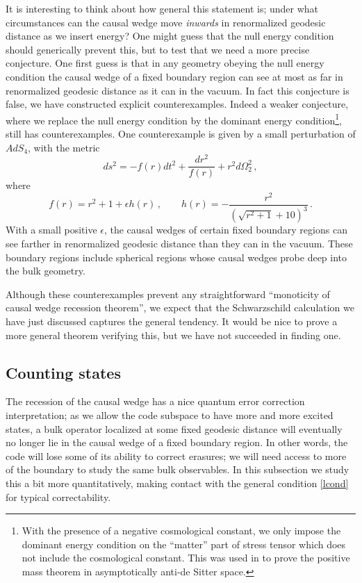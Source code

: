 \documentclass[12pt]{article}
\newcommand{\be}{\begin{equation}}
\newcommand{\ee}{\end{equation}}
\begin{document}
It is interesting to think about how general this statement is; under what circumstances can the causal wedge move \textit{inwards} in renormalized geodesic distance as we insert energy?  One might guess that the null energy condition should generically prevent this, but to test that we need a more precise conjecture.  One first guess is that in any geometry obeying the null energy condition the causal wedge of a fixed boundary region can see at most as far in renormalized geodesic distance as it can in the vacuum.  In fact this conjecture is false, we have constructed explicit counterexamples.  Indeed a weaker conjecture, where we replace the null energy condition by the dominant energy condition\footnote{With the presence of a negative cosmological constant, we only impose the dominant energy condition on the ``matter'' part of stress tensor which does not include the cosmological constant.  This was used in \cite{Gibbons:1982jg} to prove the positive mass theorem in asymptotically anti-de Sitter space.}, still has counterexamples.  One counterexample is given by a small perturbation of $AdS_4$, with the metric
\be
ds^2 = -f(r) dt^2 + \frac{dr^2}{f(r)} + r^2 d\Omega_2^2 \,,
\ee
where
\be
f(r) = r^2 + 1 + \epsilon h(r) \,,\qquad
h(r) = -\frac{r^2}{\left(\sqrt{r^2+1}+10\right)^3} \,.
\ee
With a small positive $\epsilon$, the causal wedges of certain fixed boundary regions can see farther in renormalized geodesic distance than they can in the vacuum.  These boundary regions include spherical regions whose causal wedges probe deep into the bulk geometry.

Although these counterexamples prevent any straightforward ``monoticity of causal wedge recession theorem'', we expect that the Schwarzschild calculation we have just discussed captures the general tendency.  It would be nice to prove a more general theorem verifying this, but we have not succeeded in finding one.



\subsection{Counting states}\label{countstate}
The recession of the causal wedge has a nice quantum error correction interpretation; as we allow the code subspace to have more and more excited states, a bulk operator localized at some fixed geodesic distance will eventually no longer lie in the causal wedge of a fixed boundary region.  In other words, the code will lose some of its ability to correct erasures; we will need access to more of the boundary to study the same bulk observables.   In this subsection we study this a bit more quantitatively, making contact with the general condition \eqref{lcond} for typical correctability.  
\end{document}
